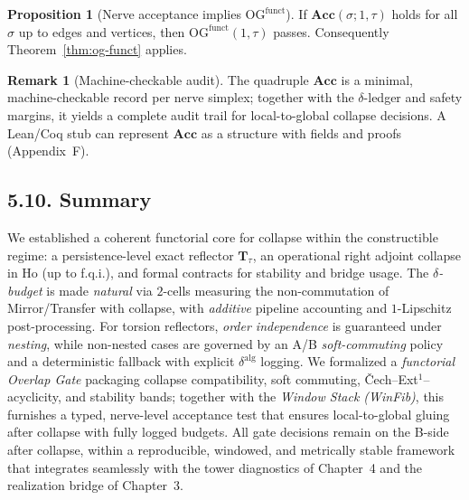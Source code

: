 \documentclass[11pt]{article}
\numberwithin{equation}{section}
\theoremstyle{plain}
\theoremstyle{definition}
\theoremstyle{remark}
\DeclareRobustCommand{\hyp}{\nobreakdash-}
\theoremstyle{plain}
\theoremstyle{definition}
\numberwithin{equation}{section}
\newtheorem{proposition}[theorem]{Proposition}
\theoremstyle{definition}
\newtheorem{remark}[theorem]{Remark}
\numberwithin{equation}{section}
\theoremstyle{plain}
\theoremstyle{definition}
\theoremstyle{remark}
\begin{document}
\begin{proposition}[Nerve acceptance implies \texorpdfstring{$\mathrm{OG}^{\mathrm{funct}}$}{OG^funct}]\label{prop:nerve-accept}
If $\mathbf{Acc}(\sigma;1,\tau)$ holds for all $\sigma$ up to edges and vertices, then $\mathrm{OG}^{\mathrm{funct}}(1,\tau)$ passes. Consequently Theorem~\ref{thm:og-funct} applies.
\end{proposition}

\begin{remark}[Machine-checkable audit]
The quadruple $\mathbf{Acc}$ is a minimal, machine-checkable record per nerve simplex; together with the $\delta$-ledger and safety margins, it yields a complete audit trail for local-to-global collapse decisions. A Lean/Coq stub can represent $\mathbf{Acc}$ as a structure with fields and proofs (Appendix~F).
\end{remark}

\subsection*{5.10. Summary}
We established a coherent functorial core for collapse within the constructible regime: a persistence\hyp level exact reflector $\mathbf{T}_\tau$, an operational right adjoint collapse in $\mathrm{Ho}$ (up to f.q.i.), and formal contracts for stability and bridge usage. The \emph{$\delta$-budget} is made \emph{natural} via $2$-cells measuring the non\hyp commutation of Mirror/Transfer with collapse, with \emph{additive} pipeline accounting and $1$-Lipschitz post\hyp processing. For torsion reflectors, \emph{order independence} is guaranteed under \emph{nesting}, while non\hyp nested cases are governed by an A/B \emph{soft\hyp commuting} policy and a deterministic fallback with explicit $\delta^{\mathrm{alg}}$ logging. We formalized a \emph{functorial Overlap Gate} packaging collapse compatibility, soft commuting, Čech–Ext$^{1}$–acyclicity, and stability bands; together with the \emph{Window Stack (WinFib)}, this furnishes a typed, nerve-level acceptance test that ensures local-to-global gluing after collapse with fully logged budgets. All gate decisions remain on the B\hyp side after collapse, within a reproducible, windowed, and metrically stable framework that integrates seamlessly with the tower diagnostics of Chapter~4 and the realization bridge of Chapter~3.


\end{document}
